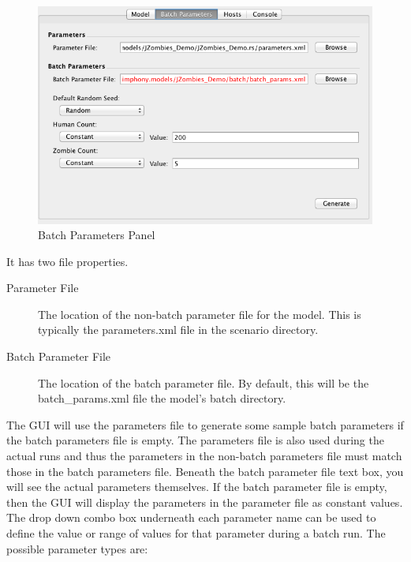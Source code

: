 \documentclass[11pt]{amsart}
\begin{document}
\begin{figure}[h]
\begin{center}
\vspace{.2in}
\centerline {
\includegraphics[width=6in]{images/batch_params_panel.png}
}
\caption{Batch Parameters Panel}
\label{fig:batch_params}
\end{center}
\end{figure}

\noindent It has two file properties.

\begin{description}
\item[Parameter File] The location of the non-batch parameter file for the model. This is typically the parameters.xml file in the scenario directory.
\item[Batch Parameter File] The location of the batch parameter file. By default, this will be the batch\_params.xml file the model's batch directory.
\end{description}

The GUI will use the parameters file to generate some sample batch parameters if the batch parameters file is empty. The parameters file is also used during the actual runs and thus the parameters in the non-batch parameters file must match those in the batch parameters file. Beneath the batch parameter file text box, you will see the actual parameters themselves. If the batch parameter file is empty, then the GUI will display the parameters in the parameter file as constant values. The drop down combo box underneath each parameter name can be used to define the value or range of values for that parameter during a batch run. The possible parameter types are:
\end{document}
